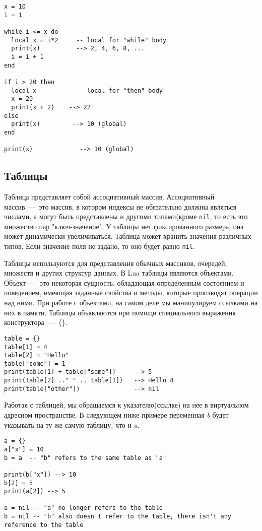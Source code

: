\begin{lstlisting}
x = 10
i = 1  
    
while i <= x do
  local x = i*2     -- local for "while" body
  print(x)          --> 2, 4, 6, 8, ...
  i = i + 1
end
  
if i > 20 then
  local x           -- local for "then" body
  x = 20
  print(x + 2)	  --> 22
else
  print(x)         --> 10 (global)
end
    
print(x)             --> 10 (global)
\end{lstlisting}

\subsection{Таблицы}
\label{subsec:tables}

Таблица представляет собой ассоциативный массив. Ассоциативный массив~---~это массив, в котором индексы не обязательно должны являться числами, а могут быть представлены и другими типами(кроме \lstinline{nil}, то есть это множество пар "ключ-значение". У таблицы нет фиксированного размера, она может динамически увеличиваться. Таблица может хранить значения различных типов. Если значение поля не задано, то оно будет равно \lstinline{nil}. 

Таблицы используются для представления обычных массивов, очередей, множеств и других структур данных. В Lua таблицы являются объектами. Объект~---~это некоторая сущность, обладающая определенным состоянием и поведением, имеющая заданные свойства и методы, которые производят операции над ними. При работе с объектами, на самом деле мы манипулируем ссылками на них в памяти. Таблицы объявляются при помощи специального выражения  конструктора~---~\{\}. 

\begin{lstlisting}
table = {}
table[1] = 4
table[2] = "Hello"
table["some"] = 1
print(table[1] + table["some"])     --> 5
print(table[2] .." " .. table[1])   --> Hello 4
print(table["other"])               --> nil
\end{lstlisting}

Работая с таблицей, мы обращаемся к указателю(ссылке) на нее в виртуальном адресном пространстве.
В следующем ниже примере переменная \emph{b} будет указывать на ту же самую таблицу, что и \emph{a}.
\begin{lstlisting}
a = {}
a["x"] = 10
b = a  -- "b" refers to the same table as "a"  

print(b["x"]) --> 10
b[2] = 5
print(a[2]) --> 5
   
a = nil -- "a" no longer refers to the table
b = nil -- "b" also doesn't refer to the table, there isn't any reference to the table 
\end{lstlisting} 


